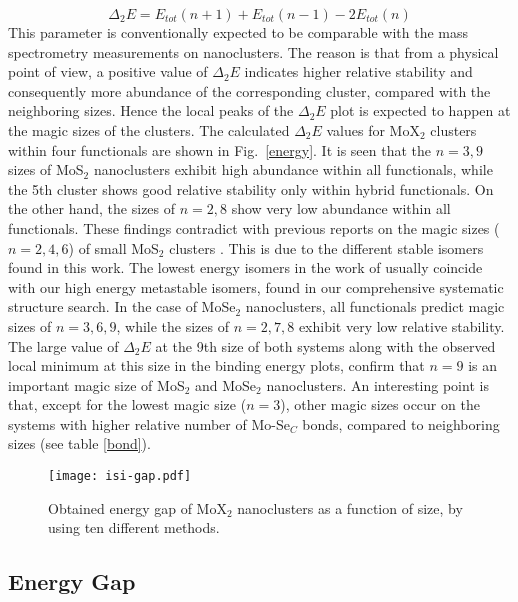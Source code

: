 \documentclass[nofootinbib,10pt,aip,twocolumn,showpacs]{revtex4-1}
\begin{document}
\begin{equation}
\Delta_{2}E=E_{tot}(n+1)+E_{tot}(n-1)-2E_{tot}(n)
\label{equ-delta2}
\end{equation}
%
This parameter is conventionally expected to be comparable with 
the mass spectrometry measurements on nanoclusters. 
The reason is that from a physical point of view, a positive value of $\Delta_{2}E$
indicates higher relative stability and consequently more abundance of 
the corresponding cluster, compared with the neighboring sizes. 
Hence the local peaks of the $\Delta_{2}E$ plot is expected 
to happen at the magic sizes of the clusters.
The calculated $\Delta_{2}E$ values for MoX$_{2}$ clusters within 
four functionals are shown in Fig.~\ref{energy}.
It is seen that the $n=3,9$ sizes of MoS$_{2}$ nanoclusters exhibit
high abundance within all functionals,
while the 5th cluster shows good relative stability only within hybrid functionals.
On the other hand, the sizes of $n=2,8$ show very low abundance within all functionals.
These findings contradict with previous reports on 
the magic sizes ($n=2,4,6$) of small MoS$_{2}$ clusters \cite{murugan2005a}. 
This is due to the different stable isomers found in this work.
The lowest energy isomers in the work of \textcite{murugan2005a}
usually coincide with our high energy metastable isomers,
found in our comprehensive systematic structure search.
In the case of MoSe$_2$ nanoclusters, all functionals predict 
magic sizes of $n=3,6,9$,
while the sizes of $n=2,7,8$ exhibit very low relative stability.
The large value of $\Delta_{2}E$ at the 9th size of both systems
along with the observed local minimum at this size in the binding energy plots,
confirm that $n=9$ is an important magic size of MoS$_2$ and MoSe$_2$ nanoclusters.
An interesting point is that, except for the lowest magic size ($n=3$),
other magic sizes occur on the systems with higher relative
number of Mo-Se$_C$ bonds, compared to neighboring sizes (see table \ref{bond}).


\begin{figure}
\texttt{[image: isi-gap.pdf]}
\caption{\label{gap}
 Obtained energy gap of MoX$_2$ nanoclusters 
 as a function of size, by using ten different methods.
}
\end{figure}


\subsection{Energy Gap}  
\end{document}
